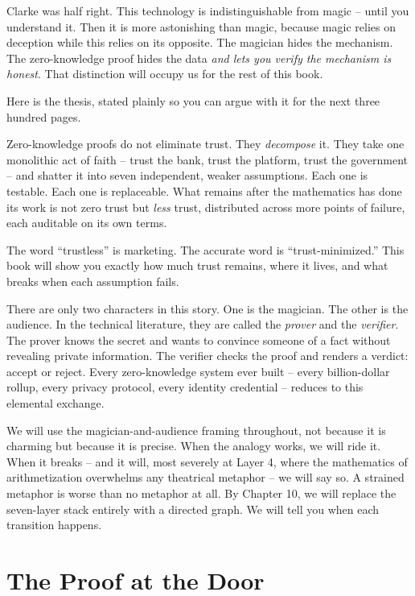 \documentclass[
  11pt,
  openany]{report}
\begin{document}
Clarke was half right. This technology is indistinguishable from magic -- until
you understand it. Then it is more astonishing than magic, because magic relies
on deception while this relies on its opposite. The magician hides the
mechanism. The zero-knowledge proof hides the data \emph{and lets you verify the
mechanism is honest}. That distinction will occupy us for the rest of this book.

Here is the thesis, stated plainly so you can argue with it for the next three
hundred pages.

Zero-knowledge proofs do not eliminate trust. They \emph{decompose} it. They
take one monolithic act of faith -- trust the bank, trust the platform, trust
the government -- and shatter it into seven independent, weaker assumptions.
Each one is testable. Each one is replaceable. What remains after the
mathematics has done its work is not zero trust but \emph{less} trust,
distributed across more points of failure, each auditable on its own terms.

The word ``trustless'' is marketing. The accurate word is ``trust-minimized.''
This book will show you exactly how much trust remains, where it lives, and what
breaks when each assumption fails.

There are only two characters in this story. One is the magician. The other is
the audience. In the technical literature, they are called the \emph{prover} and
the \emph{verifier}. The prover knows the secret and wants to convince someone
of a fact without revealing private information. The verifier checks the proof
and renders a verdict: accept or reject. Every zero-knowledge system ever built
-- every billion-dollar rollup, every privacy protocol, every identity
credential -- reduces to this elemental exchange.

We will use the magician-and-audience framing throughout, not because it is
charming but because it is precise. When the analogy works, we will ride it.
When it breaks -- and it will, most severely at Layer 4, where the mathematics
of arithmetization overwhelms any theatrical metaphor -- we will say so. A
strained metaphor is worse than no metaphor at all. By Chapter 10, we will
replace the seven-layer stack entirely with a directed graph. We will tell you
when each transition happens.

\section{The Proof at the Door}\label{the-proof-at-the-door}
\end{document}
